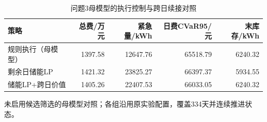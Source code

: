 \begin{table}[htbp]\centering\small
\caption{问题3母模型的执行控制与跨日续接对照}
\label{tab:v2_controllers}
\begin{tabularx}{\linewidth}{LRRRR}\toprule
策略 & 总费/万元 & 紧急量/kWh & 日费CVaR95/元 & 末库存/kWh\\\midrule
规则执行（母模型） & 1397.58 & 12647.76 & 65518.79 & 6240.32\\
剩余日储能LP & 1421.32 & 23825.27 & 66397.37 & 5934.55\\
储能LP+跨日价值 & 1405.26 & 22407.53 & 66033.05 & 6240.32\\
\bottomrule\end{tabularx}
\par\smallskip\parbox{\linewidth}{\footnotesize 未启用候选筛选的母模型对照；各组沿用原实验配置，覆盖334天并连续推进状态。}
\end{table}
